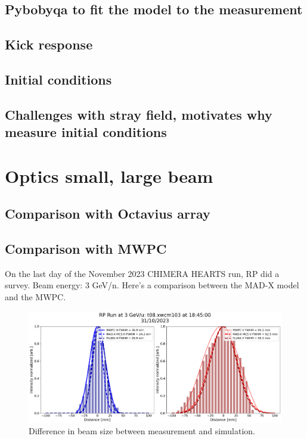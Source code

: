 \documentclass[a4paper,
               biblatex,     %
               ]{jacow}
\begin{document}
\subsection{Pybobyqa to fit the model to the measurement}
\subsection{Kick response}
\subsection{Initial conditions}
\subsection{Challenges with stray field, motivates why measure initial conditions}

\section{Optics small, large beam}
\subsection{Comparison with Octavius array}
\subsection{Comparison with MWPC}

On the last day of the November 2023 CHIMERA HEARTS run, RP did a survey.
Beam energy: 3 GeV/n. Here's a comparison between the MAD-X model and the MWPC.

\begin{figure}[!htb]
   \centering
   \includegraphics*[width=1.0\columnwidth]{rp_survey.png}
   \caption{Difference in beam size between measurement and simulation.}
   \label{fig:diff_beam_size}
\end{figure}
\end{document}

